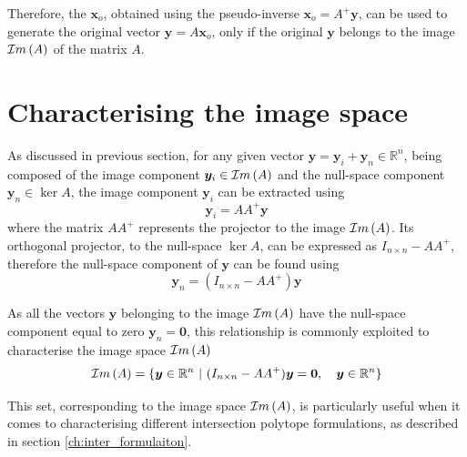 Therefore, the $\bm{x}_o$, obtained using the pseudo-inverse $\bm{x}_o=A^+\bm{y}$, can be used to generate the original vector $\bm{y} = A\bm{x}_o$, only if the original $\bm{y}$ belongs to the image $\mathcal{I}m\left(A\right)$ of the matrix $A$. 



\section{Characterising the image space}
\label{ch:image_char}

As discussed in previous section, for any given vector $\bm{y} = \bm{y}_i + \bm{y}_n\in\mathbb{R}^n$, being composed of the image component $\bm{y}_i\in\mathcal{I}m\left(A\right)$ and the null-space component $\bm{y}_n\in\ker{A}$, the image component $\bm{y}_i$ can be extracted using 
\begin{equation}
    \bm{y}_i =  AA^+\bm{y}
\end{equation}
where the matrix $AA^+$ represents the projector to the image $\mathcal{I}m\left(A\right)$. Its orthogonal projector, to the null-space $\ker{A}$, can be expressed as $I_{n\times n} - AA^+$, therefore the null-space component of $\bm{y}$ can be found using
\begin{equation}
    \bm{y}_n = (I_{n\times n} - AA^+)\bm{y}
\end{equation}

As all the vectors $\bm{y}$ belonging to the image $\mathcal{I}m\left(A\right)$ have the null-space component equal to zero $\bm{y}_n=\bm{0}$, this relationship is commonly exploited to characterise the image space $\mathcal{I}m\left(A\right)$
\begin{equation}
   \mathcal{I}m\left(A\right) = \{ \bm{y}\in\mathbb{R}^n ~|~(I_{n\times n} - AA^+)\bm{y} = \bm{0}, \quad \bm{y}\in\mathbb{R}^n \}
   \label{eq:image_poly}
\end{equation}

This set, corresponding to the image space $\mathcal{I}m\left(A\right)$, is particularly useful when it comes to characterising different intersection polytope formulations, as described in section \ref{ch:inter_formulaiton}.

